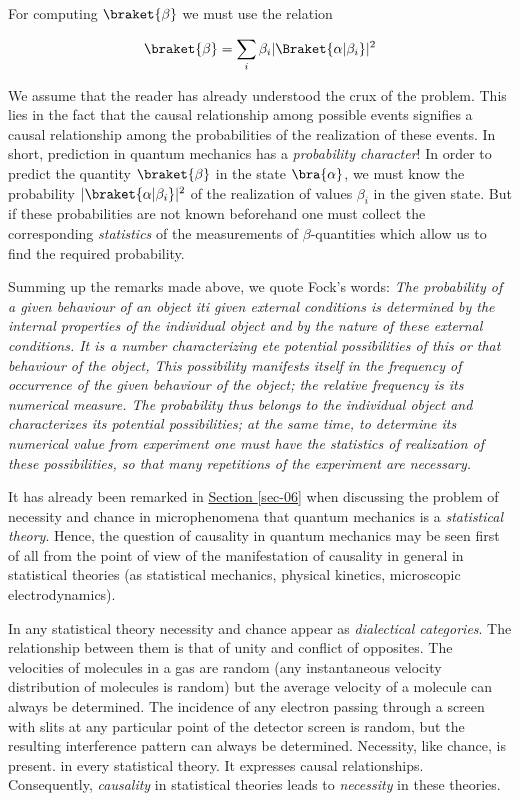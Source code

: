 \documentclass[a4paper,sfsidenotes,colorlinks=true]{tufte-book}
\numberwithin{equation}{section}
\numberwithin{figure}{section}
\begin{document}
For computing $\braket{\beta}$ we must use the relation 

\begin{equation}%
\braket{\beta} = \sum_{i} \beta_{i} | \Braket{\alpha|\beta_{i}} |^{2}
\label{eq-12.3}
\end{equation}

We assume that the reader has already understood the crux of the
problem. This lies in the fact that the causal relationship among
possible events signifies a causal relationship among the
probabilities of the realization of these events. In short, prediction
in quantum mechanics has a \emph{probability character}! In order to
predict the quantity $\braket{\beta}$ in the state $\bra{\alpha}$, we
must know the probability $|\braket{\alpha | \beta_{i}}|^{2}$ of the
realization of values $\beta_{i}$ in the given state. But if these
probabilities are not known beforehand one must collect the
corresponding \emph{statistics} of the measurements of
$\beta$-quantities which allow us to find the required probability.


Summing up the remarks made above, we quote Fock's words: \emph{The
probability of a given behaviour of an object iti given external
conditions is determined by the internal properties of the individual
object and by the nature of these external conditions. It is a number
characterizing ete potential possibilities of this or that behaviour
of the object, This possibility manifests itself in the frequency of
occurrence of the given behaviour of the object; the relative
frequency is its numerical measure. The probability thus belongs to
the individual object and characterizes its potential possibilities;
at the same time, to determine its numerical value from experiment one
must have the statistics of realization of these possibilities, so
that many repetitions of the experiment are necessary.}

It  has already been
remarked in \hyperref[sec-06]{Section \ref{sec-06}} when discussing
the problem of necessity and chance in microphenomena that quantum
mechanics is a \emph{statistical theory}. Hence, the question of causality in
quantum mechanics may be seen first of all from the point of view of
the manifestation of causality in general in statistical theories
(as statistical mechanics, physical kinetics, microscopic
electrodynamics).

In any statistical theory necessity and chance appear as
\emph{dialectical categories}. The relationship between them is that
of unity and conflict of opposites. The velocities of molecules in a
gas are random (any instantaneous velocity distribution of molecules
is random) but the average velocity of a molecule can always be
determined. The incidence of any electron passing through a screen
with slits at any particular point of the detector screen is random,
but the resulting interference pattern can always be
determined. Necessity, like chance, is present. in every statistical
theory. It expresses causal relationships. Consequently,
\emph{causality} in statistical theories leads to \emph{necessity} in
these theories.
\end{document}
